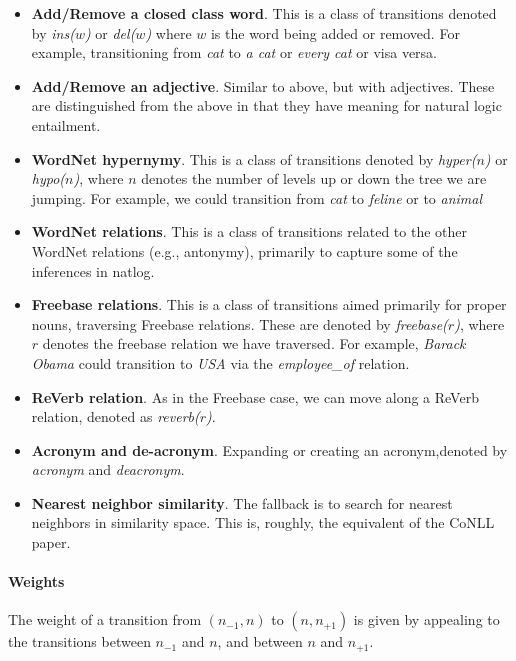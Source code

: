 \documentclass[11pt,a4paper]{article}
\def\w#1{\textit{#1}}
\begin{document}
\begin{itemize}
\item \textbf{Add/Remove a closed class word}.
      This is a class of transitions denoted by
      \textit{ins($w$)} or \textit{del($w$)} 
      where $w$ is the word being added or removed.
      For example, transitioning from \w{cat} to
      \w{a cat} or \w{every cat} or visa versa.
\item \textbf{Add/Remove an adjective}.
      Similar to above, but with adjectives. These are distinguished
      from the above in that they have meaning for natural logic
      entailment.
\item \textbf{WordNet hypernymy}.
      This is a class of transitions denoted by
      \textit{hyper($n$)} or \textit{hypo($n$)},
      where $n$ denotes the number of levels up or
      down the tree we are jumping.
      For example, we could transition from \w{cat}
      to \w{feline} or to \w{animal}
\item \textbf{WordNet relations}.
      This is a class of transitions related to the other
      WordNet relations (e.g., antonymy), primarily to
      capture some of the inferences in natlog.
\item \textbf{Freebase relations}.
      This is a class of transitions aimed primarily
      for proper nouns, traversing Freebase relations.
      These are denoted by \textit{freebase($r$)},
      where $r$ denotes the freebase relation we
      have traversed.
      For example, \w{Barack Obama} could transition
      to \w{USA} via the \textit{employee\_of}
      relation.
\item \textbf{ReVerb relation}.
      As in the Freebase case, we can move along a
      ReVerb relation, denoted as \textit{reverb($r$)}.
\item \textbf{Acronym and de-acronym}.
      Expanding or creating an acronym,denoted by
      \textit{acronym} and \textit{deacronym}.
\item \textbf{Nearest neighbor similarity}.
      The fallback is to search for nearest neighbors in similarity space.
      This is, roughly, the equivalent of the CoNLL paper.
\end{itemize}

\paragraph{Weights}
The weight of a transition from $(n_{-1},n)$ to
  $(n,n_{+1})$ is given by appealing to the
  transitions between $n_{-1}$ and $n$, and between
  $n$ and $n_{+1}$.
\end{document}
